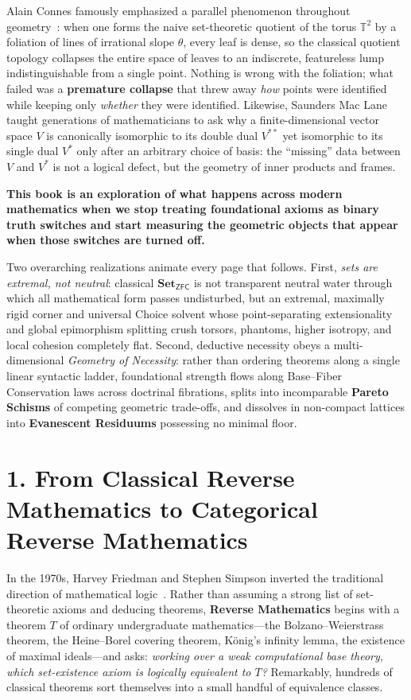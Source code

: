 \documentclass[10pt,twoside,openright]{book}
\theoremstyle{crmplain}
\theoremstyle{crmdef}
\theoremstyle{crmremark}
\begin{document}
Alain Connes famously emphasized a parallel phenomenon throughout geometry~\cite[Ch.~II]{Connes94}: when one forms the naive set-theoretic quotient of the torus $\mathbb{T}^2$ by a foliation of lines of irrational slope $\theta$, every leaf is dense, so the classical quotient topology collapses the entire space of leaves to an indiscrete, featureless lump indistinguishable from a single point. Nothing is wrong with the foliation; what failed was a \textbf{premature collapse} that threw away \emph{how} points were identified while keeping only \emph{whether} they were identified. Likewise, Saunders Mac Lane taught generations of mathematicians to ask why a finite-dimensional vector space $V$ is canonically isomorphic to its double dual $V^{**}$ yet isomorphic to its single dual $V^*$ only after an arbitrary choice of basis: the ``missing'' data between $V$ and $V^*$ is not a logical defect, but the geometry of inner products and frames.

\textbf{This book is an exploration of what happens across modern mathematics when we stop treating foundational axioms as binary truth switches and start measuring the geometric objects that appear when those switches are turned off.}

Two overarching realizations animate every page that follows. First, \emph{sets are extremal, not neutral}: classical $\mathbf{Set}_{\mathsf{ZFC}}$ is not transparent neutral water through which all mathematical form passes undisturbed, but an extremal, maximally rigid corner and universal Choice solvent whose point-separating extensionality and global epimorphism splitting crush torsors, phantoms, higher isotropy, and local cohesion completely flat. Second, deductive necessity obeys a multi-dimensional \emph{Geometry of Necessity}: rather than ordering theorems along a single linear syntactic ladder, foundational strength flows along Base--Fiber Conservation laws across doctrinal fibrations, splits into incomparable \textbf{Pareto Schisms} of competing geometric trade-offs, and dissolves in non-compact lattices into \textbf{Evanescent Residuums} possessing no minimal floor.

\section*{1. From Classical Reverse Mathematics to Categorical Reverse Mathematics}

In the 1970s, Harvey Friedman and Stephen Simpson inverted the traditional direction of mathematical logic~\cite{Friedman75,Simpson09}. Rather than assuming a strong list of set-theoretic axioms and deducing theorems, \textbf{Reverse Mathematics} begins with a theorem $T$ of ordinary undergraduate mathematics---the Bolzano--Weierstrass theorem, the Heine--Borel covering theorem, K\"onig's infinity lemma, the existence of maximal ideals---and asks: \emph{working over a weak computational base theory, which set-existence axiom is logically equivalent to $T$?} Remarkably, hundreds of classical theorems sort themselves into a small handful of equivalence classes.
\end{document}
